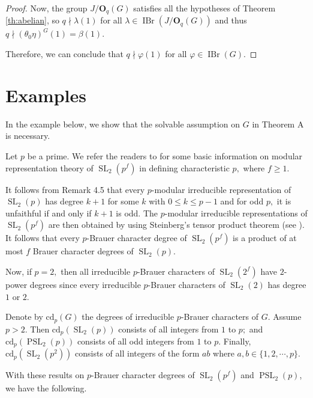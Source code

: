 \documentclass[12pt]{amsart}
\theoremstyle{remark}
\numberwithin{equation}{section}
\begin{document}
\begin{proof}
Now, the group $J/{\mathbf{O}}_q(G)$ satisfies all the hypotheses of Theorem \ref{th:abelian}, so $q\nmid \lambda(1)$ for all $\lambda\in\operatorname{IBr}(J/{\mathbf{O}}_q(G))$ and thus $q\nmid (\theta_0\eta)^G (1) = \beta (1)$.

Therefore, we can conclude that $q\nmid \varphi(1)$ for all $\varphi\in\operatorname{IBr}(G).$
\end{proof}

\section{Examples}

In the example below, we show that the solvable assumption on $G$ in Theorem A is necessary.

Let $p$ be a prime. We refer the readers to \cite{Lubeck} for some basic information on modular representation theory of $\operatorname{SL}_2(p^f)$ in defining characteristic $p,$ where $f\ge 1.$

It follows from Remark 4.5 \cite{Lubeck} that every $p$-modular irreducible representation of $\operatorname{SL}_2(p)$ has degree $k+1$ for some $k$ with $0\le k\le p-1$ and for odd $p,$ it is unfaithful if and only if $k+1$ is odd. The $p$-modular irreducible representations of $\operatorname{SL}_2(p^f)$ are then obtained by using Steinberg's tensor product theorem (see \cite[Theorem~2.2]{Lubeck}). It follows that every $p$-Brauer character degree of $\operatorname{SL}_2(p^f)$ is a product of at most $f$ Brauer character degrees of $\operatorname{SL}_2(p).$

Now, if $p=2,$ then all irreducible $p$-Brauer characters of $\operatorname{SL}_2(2^f)$ have $2$-power degrees since every irreducible $p$-Brauer characters of $\operatorname{SL}_2(2)$ has degree $1$ or $2.$

Denote by ${{\mathrm {cd}}}_p(G)$ the degrees of irreducible $p$-Brauer characters of $G.$
Assume $p>2.$ Then ${{\mathrm {cd}}}_p(\operatorname{SL}_2(p))$ consists of all integers from $1$ to $p;$ and ${{\mathrm {cd}}}_p(\operatorname{PSL}_2(p))$ consists of all odd integers from $1$ to $p.$ Finally, ${{\mathrm {cd}}}_p(\operatorname{SL}_2(p^2))$ consists of all integers of the form $ab$ where $a,b\in\{1,2,\cdots,p\}.$

With these results on $p$-Brauer character degrees of $\operatorname{SL}_2(p^f)$ and $\operatorname{PSL}_2(p)$, we have the following.
\end{document}
